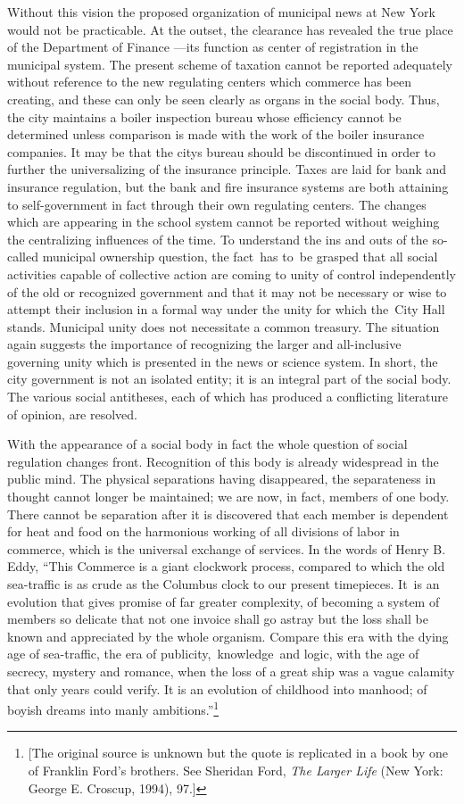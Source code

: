 \documentclass[openany,nobib]{tufte-book}
\begin{document}
Without this vision the proposed organization of municipal news at New
York would not be practicable. At the outset, the clearance has revealed
the true place of the Department of Finance ---its function as center of
registration in the municipal system. The present scheme of taxation
cannot be reported adequately without reference to the new regulating
centers which commerce has been creating, and these can only be seen
clearly as organs in the social body. Thus, the city maintains a boiler
inspection bureau whose efficiency cannot be determined unless
comparison is made with the work of the boiler insurance companies. It
may be that the city\textquotesingle s bureau should be discontinued in
order to further the universalizing of the insurance principle. Taxes
are laid for bank and insurance regulation, but the bank and fire
insurance systems are both attaining to self-government in fact through
their own regulating centers. The changes which are appearing in the
school system cannot be reported without weighing the centralizing
influences of the time. To understand the ins and outs of the so-called
municipal ownership question, the fact~has to~be grasped that all social
activities capable of collective action are coming to unity of control
independently of the old or recognized government and that it may not be
necessary or wise to attempt their inclusion in a formal way under the
unity for which the~City Hall stands. Municipal unity does not
necessitate a common treasury. The situation again suggests the
importance of recognizing the larger and all-inclusive governing unity
which is presented in the news or science system. In short, the city
government is not an isolated entity; it is an integral part of the
social body. The various social antitheses, each of which has produced a
conflicting literature of opinion, are resolved.~

With the appearance of a social body in fact the whole question of
social regulation changes front. Recognition of this body is already
widespread in the public mind. The physical separations having
disappeared, the separateness in thought cannot longer be maintained; we
are now, in fact, members of one body. There cannot be separation after
it is discovered that each member is dependent for heat and food on the
harmonious working of all divisions of labor in commerce, which is the
universal exchange of services. In the words of Henry B. Eddy, ``This
Commerce is a giant clockwork process, compared to which the old
sea-traffic is as crude as the Columbus clock to our present timepieces.
It~is an evolution that gives promise of far greater complexity, of
becoming a system of members so delicate that not one invoice shall go
astray but the loss shall be known and appreciated by the whole
organism. Compare this era with the dying age of sea-traffic, the era of
publicity,~knowledge~and logic, with the age of secrecy, mystery and
romance, when the loss of a great ship was a vague calamity that only
years could verify. It is an evolution of childhood into manhood; of
boyish dreams into manly ambitions.''\footnote{{[}The original source is
  unknown but the quote is replicated in a book by one of Franklin
  Ford's brothers. See Sheridan Ford, \emph{The Larger Life} (New York:
  George E. Croscup, 1994), 97.{]}}~
\end{document}
